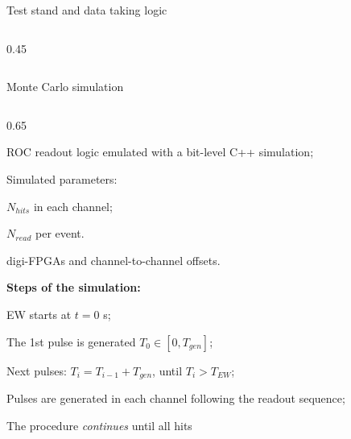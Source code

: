 \documentclass{beamer}
\begin{document}
\begin{frame}{Test stand and data taking logic}
\begin{columns}
\begin{column}{0.45\framewidth}
\begin{figure}[H]
        \label{fig:enter-label} 
    \end{figure}
\end{column}
\end{columns}




          \end{frame}




\begin{frame}{Monte Carlo simulation}


   \vspace{-3mm}
   \begin{columns}
 \begin{column}{0.65\framewidth} 

       \begin{itemize}
       {\footnotesize
           \item ROC readout logic emulated with a bit-level C++ simulation;
           \vspace{0.8mm}
           \item Simulated parameters:
          \vspace{0.8mm}
           \begin{itemize}
            {\footnotesize  \item $N_{hits}$ in each channel;
               \item $N_{read}$ per event.}
           \end{itemize}
          \vspace{0.8mm}
           \item digi-FPGAs and channel-to-channel offsets. }
       \end{itemize}
      \vspace{0.8mm}
      {\footnotesize  \textbf{Steps of the simulation:}}
     \vspace{0.8mm}
\begin{itemize}
{\footnotesize
\item EW starts at $t=0$ s;
\vspace{0.8mm}
 \item The 1st pulse is generated $T_0\in [0 ,T_{gen}]$;
\vspace{0.8mm}
   \item Next pulses: $T_i = T_{i-1} + T_{gen}$, until $T_i> T_{EW}$;
   \vspace{0.8mm}
\item Pulses are generated in each channel following the readout sequence;
\vspace{0.8mm}
 \item The procedure \textit{continues} until all hits 
}
\end{itemize}
\end{column}
\end{columns}
\end{frame}
\end{document}
